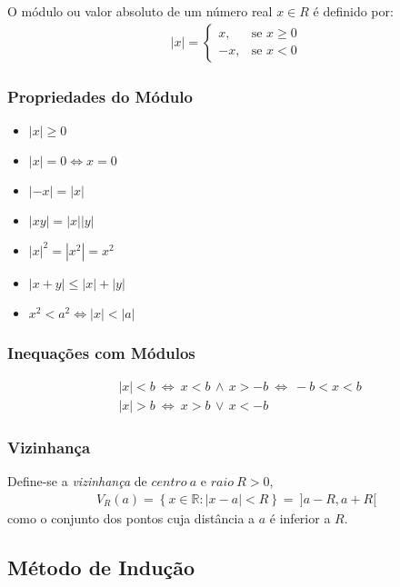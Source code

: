 \documentclass[11pt]{article}
\newcommand{\twopartdef}[4]
{ \displaystyle
	\left\{
		\begin{array}{ll}
			#1, & \mbox{se } #2 \\
			#3, & \mbox{se } #4
		\end{array}
	\right.
}
\begin{document}
O módulo ou valor absoluto de um número real $x \in R$ é definido por:
\begin{align*}
    |x| = \twopartdef{x}{x \geq 0}{-x}{x < 0}
\end{align*}

\subsubsection{Propriedades do Módulo}

\begin{itemize}[itemsep=2pt]
    \item $|x| \geq 0$
    \item $|x| = 0 \Leftrightarrow  x = 0$
    \item $|-x| = |x|$
    \item $|xy| = |x||y|$
    \item $|x|^2 = \left\lvert x^2\right\rvert = x^2$
    \item $|x + y| \leq |x| + |y|$
    \item $x^2 < a^2 \Leftrightarrow |x| < |a|$
\end{itemize}

\subsubsection{Inequações com Módulos}

\begin{align*}
    & \left\lvert x \right\rvert < b\ \Leftrightarrow\ x < b\,\land\,x > -b\  \Leftrightarrow\ -b < x < b\ \\
    & \left\lvert x \right\rvert > b\ \Leftrightarrow\ x > b\,\lor \,x < -b
\end{align*}

\subsubsection{Vizinhança}

Define-se a \textit{vizinhança} de $centro\ a$ e $raio\ R > 0$, 
\begin{align*}
    V_R(a) = \left\{x \in \mathbb{R}:|x-a| < R\right\} =\ ]a-R, a+R[
\end{align*}
como o conjunto dos pontos cuja distância a $a$ é inferior a $R$.

\subsection{Método de Indução}
\end{document}
